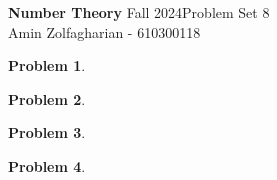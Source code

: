 \documentclass[12pt]{article}
\newcommand{\customanswer}[1]{%
\begin{problem}
\end{problem}

}
\newtheorem{problem}{Problem}
\begin{document}
\noindent \textbf{Number Theory} Fall 2024\hfill Problem Set 8\\
Amin Zolfagharian - 610300118

\hrulefill

\customanswer{1}
\customanswer{2}
\customanswer{3}
\customanswer{4}
\end{document}
